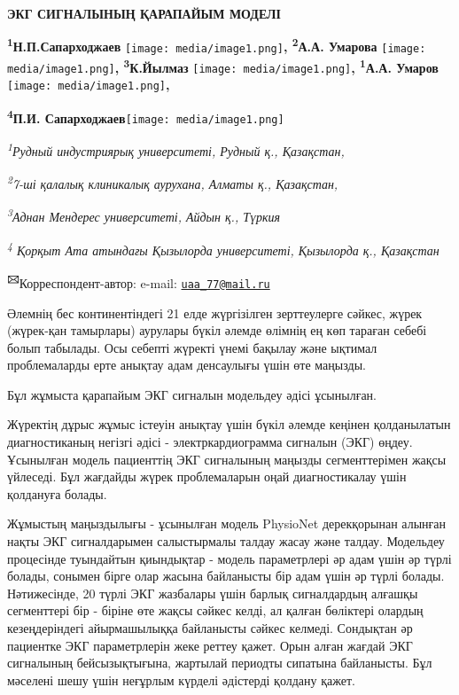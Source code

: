 \documentclass[
]{article}
\begin{document}
\textbf{ЭКГ СИГНАЛЫНЫҢ ҚАРАПАЙЫМ МОДЕЛІ}

\textbf{\textsuperscript{1}Н.П.Сапарходжаев}
\texttt{[image: media/image1.png]}\textbf{,
\textsuperscript{2}А.А. Умарова}
\texttt{[image: media/image1.png]}\textbf{,
\textsuperscript{3}К.Йылмаз}
\texttt{[image: media/image1.png]}\textbf{,
\textsuperscript{1}А.А. Умаров}
\texttt{[image: media/image1.png]}\textbf{,}

\textbf{\textsuperscript{4}П.И.
Сапарходжаев}\texttt{[image: media/image1.png]}

\emph{\textsuperscript{1}Рудный индустриярық университеті, Рудный қ.,
Қазақстан,}

\emph{\textsuperscript{2}7-ші қалалық клиникалық аурухана, Алматы қ.,
Қазақстан,}

\emph{\textsuperscript{3}Аднан Мендерес университеті, Айдын қ., Түркия}

\emph{\textsuperscript{4} Қорқыт Ата атындағы Қызылорда университеті,
Қызылорда қ., Қазақстан}

\textbf{\textsuperscript{🖂}}Корреспондент-автор: e-mail:
\href{mailto:uaa_77@mail.ru}{\nolinkurl{uaa\_77@mail.ru}}

Әлемнің бес континентіндегі 21 елде жүргізілген зерттеулерге сәйкес,
жүрек (жүрек-қан тамырлары) аурулары бүкіл әлемде өлімнің ең көп тараған
себебі болып табылады. Осы себепті жүректі үнемі бақылау және ықтимал
проблемаларды ерте анықтау адам денсаулығы үшін өте маңызды.

Бұл жұмыста қарапайым ЭКГ сигналын модельдеу әдісі ұсынылған.

Жүректің дұрыс жұмыс істеуін анықтау үшін бүкіл әлемде кеңінен
қолданылатын диагностиканың негізгі әдісі - электркардиограмма сигналын
(ЭКГ) өңдеу. Ұсынылған модель пациенттің ЭКГ сигналының маңызды
сегменттерімен жақсы үйлеседі. Бұл жағдайды жүрек проблемаларын оңай
диагностикалау үшін қолдануға болады.

Жұмыстың маңыздылығы - ұсынылған модель PhysioNet дерекқорынан алынған
нақты ЭКГ сигналдарымен салыстырмалы талдау жасау және талдау. Модельдеу
процесінде туындайтын қиындықтар - модель параметрлері әр адам үшін әр
түрлі болады, сонымен бірге олар жасына байланысты бір адам үшін әр
түрлі болады. Нәтижесінде, 20 түрлі ЭКГ жазбалары үшін барлық
сигналдардың алғашқы сегменттері бір - біріне өте жақсы сәйкес келді, ал
қалған бөліктері олардың кезеңдеріндегі айырмашылыққа байланысты сәйкес
келмеді. Сондықтан әр пациентке ЭКГ параметрлерін жеке реттеу қажет.
Орын алған жағдай ЭКГ сигналының бейсызықтығына, жартылай периодты
сипатына байланысты. Бұл мәселені шешу үшін неғұрлым күрделі әдістерді
қолдану қажет.
\end{document}

